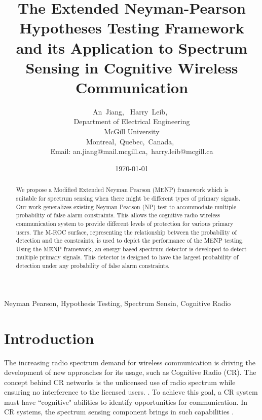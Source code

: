 \documentclass[12pt,journal,a4paper,twoside,onecolumn]{IEEEtran}
\author{An~Jiang,~
        Harry~Leib,~\\
          Department of Electrical Engineering\\
          McGill University\\
          Montreal,~Quebec,~Canada,~\\
          Email: an.jiang@mail.mcgill.ca,~harry.leib@mcgill.ca
}
\title{The Extended Neyman-Pearson Hypotheses Testing Framework and its Application to Spectrum Sensing in Cognitive Wireless Communication}
\date{\today}
\begin{document}
\begin{spacing}{2}
\maketitle
\begin{abstract}
We propose a Modified Extended Neyman Pearson (MENP) framework which is suitable for spectrum sensing when there might be different types of primary signals. Our work generalizes existing Neyman Pearson (NP) test to accommodate multiple probability of false alarm constraints. This allows the cognitive radio wireless communication system to provide different levels of protection for various primary users.  
The M-ROC surface, representing the relationship between the probability of detection and the constraints, is used to depict the performance of the MENP testing.   
Using the MENP framework, an energy based spectrum detector is developed to detect multiple primary signals. This detector is designed to have the largest probability of detection under any probability of false alarm constraints. 
\end{abstract}

\begin{IEEEkeywords}
Neyman Pearson, Hypothesis Testing, Spectrum Sensin, Cognitive Radio
\end{IEEEkeywords}

\section{Introduction}
The increasing radio spectrum demand for wireless communication is driving the development of new approaches for its usage, such as Cognitive Radio (CR)\cite{a001}. The concept behind CR networks is the unlicensed use of radio spectrum while ensuring no interference to the licensed users. \cite{goldsmith2009breaking}.
To achieve this goal, a CR system must have ``cognitive" abilities to identify opportunities for communication\cite{buddhikot2007understanding}. In CR systems, the spectrum sensing component brings in such capabilities \cite{tandra2009spectrum}.


\end{spacing}
\end{document}
